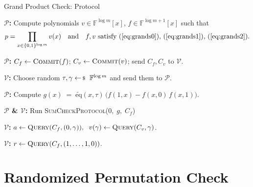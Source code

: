 \documentclass{zkdl-presentation-template}
\begin{document}
    \begin{frame}{Grand Product Check: Protocol}
        \small
        \begin{algorithm}[H]
            \caption{Grand Product Check}\label{alg:sum_check_grand_product}
            \DontPrintSemicolon
            \SetAlgoLined

            \textbf{$\mathcal P$:}
            Compute polynomials
            $v\in\mathbb{F}^{\log m}[x]$,
            $f\in\mathbb{F}^{\log m+1}[x]$
            such that
            \vspace{-1em}
            \begin{equation*}
                \vspace{-1.6em}
                p = \prod_{x\in\{0,1\}^{\log m}} v(x)
                \quad\text{and}\quad
                f, v \text{ satisfy }(\ref{eq:grands0}),\,(\ref{eq:grands1}),\,(\ref{eq:grands2}).
                \vspace{-5px}
            \end{equation*}\;

            \textbf{$\mathcal P$:}
            $C_f \leftarrow \textsc{Commit}(f)$;
            $C_v \leftarrow \textsc{Commit}(v)$;
            send $C_f, C_v$ to $\mathcal V$.\;

            \textbf{$\mathcal V$:}
            Choose random $\tau,\gamma \leftarrowS \mathbb{F}^{\log m}$ and send them to $\mathcal P$.\;

            \textbf{$\mathcal P$:}
            Compute $g(x)\;=\;\widetilde{\mathrm{eq}}(x,\tau)\,\bigl(f(1,x)-f(x,0)\,f(x,1)\bigr).$

            \textbf{$\mathcal P$ \& $\mathcal V$:}
            Run \textsc{SumCheckProtocol}($0,\;g,\;C_f$)

            \textbf{$\mathcal V$:}
            $a \leftarrow \textsc{Query}(C_f,(0,\gamma)), \;$ $v(\gamma)\leftarrow \textsc{Query}(C_v,\gamma)$.\;

            \textbf{$\mathcal V$:}
            $r \leftarrow \textsc{Query}(C_f,(1,\dots,1,0))$.\;
        \end{algorithm}
    \end{frame}

    \section{Randomized Permutation Check}
\end{document}
